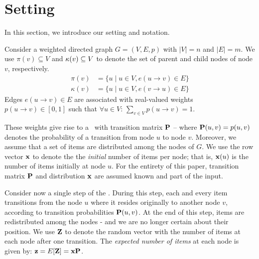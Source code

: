 \section{Setting}
\label{sec:setting}
In this section, we introduce our setting and notation.

Consider a weighted directed graph 
$G=(V,E,p)$ with $|V|=n$ and $|E|=m$.
We use $\pi(v)\subseteq V$ and $\kappa(v)\subseteq V$ to 
denote the set of parent and child nodes of node $v$, respectively.
\begin{align*}
\pi(v) & = \{u\mid u\in V, e(u\rightarrow v)\in E\} \\
\kappa(v) & = \{u\mid u\in V, e(v\rightarrow u)\in E\}
\end{align*}
Edges $e(u\rightarrow v)\in E$ are associated with 
real-valued weights $p(u\rightarrow v)\in [0,1]$
such that $\forall u\in V$: 
$
  \sum_{v\in V} p(u\rightarrow v) = 1$.

These weights give rise to a \markovchain\
with transition matrix $\mathbf{P}$ --
where $\mathbf{P}(u,v) = p(u,v)$ denotes
the probability of a transition from node $u$ to node $v$. 
Moreover, we assume that a set of items
are distributed among the nodes of $G$. 
We use the row vector $\mathbf{x}$ to denote the 
the {\it initial} number of items per node; 
that is, $\mathbf{x}(u)$ is the number of items {initially}
at node $u$.
For the entirety of this paper, 
transition matrix $\mathbf{P}$ and distribution $\mathbf{x}$ are 
assumed known and part of the input.

Consider now a single step of the \markovchain. During this step, each and
every item transitions from the node $u$ where it resides originally
to another node $v$, according to transition probabilities 
$\mathbf{P}(u,v)$.
At the end of this step, items are 
redistributed among the nodes - and we are no longer certain about their
position. We use $\mathbf{Z}$ to denote the random vector with the number
of items at each node after one transition.
The \emph{expected number of items} at each node is given by: 
$\mathbf{z} = E[\mathbf{Z}] = \mathbf{x}{\mathbf{P}}$.



